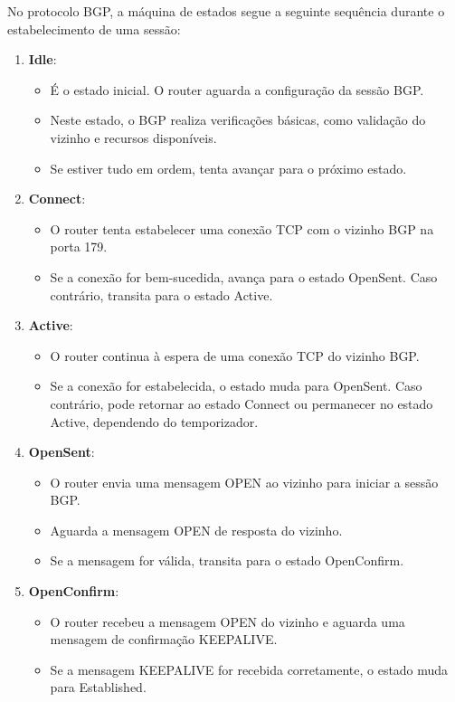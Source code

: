 \documentclass[11pt,english, openright, oneside]{book}
\begin{document}
\begin{enumerate}
  No protocolo BGP, a máquina de estados segue a seguinte sequência durante o estabelecimento de uma sessão:

  \begin{enumerate}
    \item \textbf{Idle}: 
    \begin{itemize}
      \item É o estado inicial. O router aguarda a configuração da sessão BGP.
      \item Neste estado, o BGP realiza verificações básicas, como validação do vizinho e recursos disponíveis.
      \item Se estiver tudo em ordem, tenta avançar para o próximo estado.
    \end{itemize}
    \item \textbf{Connect}: 
    \begin{itemize}
      \item O router tenta estabelecer uma conexão TCP com o vizinho BGP na porta 179.
      \item Se a conexão for bem-sucedida, avança para o estado OpenSent. Caso contrário, transita para o estado Active.
    \end{itemize}
    \item \textbf{Active}: 
    \begin{itemize}
      \item O router continua à espera de uma conexão TCP do vizinho BGP.
      \item Se a conexão for estabelecida, o estado muda para OpenSent. Caso contrário, pode retornar ao estado Connect ou permanecer no estado Active, dependendo do temporizador.
    \end{itemize}
    \item \textbf{OpenSent}:
    \begin{itemize}
      \item O router envia uma mensagem OPEN ao vizinho para iniciar a sessão BGP.
      \item Aguarda a mensagem OPEN de resposta do vizinho.
      \item Se a mensagem for válida, transita para o estado OpenConfirm.
    \end{itemize}
    \item \textbf{OpenConfirm}: 
    \begin{itemize}
      \item O router recebeu a mensagem OPEN do vizinho e aguarda uma mensagem de confirmação KEEPALIVE.
      \item Se a mensagem KEEPALIVE for recebida corretamente, o estado muda para Established.

\end{itemize}
\end{enumerate}
\end{enumerate}
\end{document}
